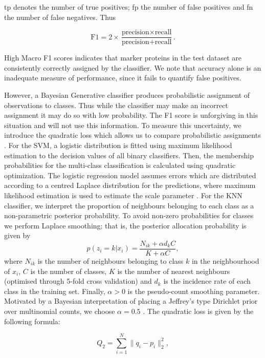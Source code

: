 \documentclass[12pt,english]{article}\usepackage[]{graphicx}\usepackage[]{color}
\begin{document}
tp denotes the number of true positives; fp the number of
false positives and fn the number of false negatives. Thus

\[\text{F1}=2\times\frac{\text{precision}\times\text{recall}}{\text{precision}+\text{recall}}.\]

High Macro F1 scores indicates that marker proteins in the
test dataset are consistently correctly assigned by the
classifier. We note that accuracy alone is an inadequate
measure of performance, since it fails to quantify
false positives.

However, a Bayesian Generative classifier produces
probabilistic assignment of observations to classes. Thus
while the classifier may make an incorrect assignment it may
do so with low probability. The F1 score is unforgiving
in this situation and will not use this information.
To measure this uncertainty, we introduce the quadratic
loss which allows us to compare probabilistic assignments \citep{Gneiting:2007}.
For the SVM, a logistic distribution is fitted
using maximum likelihood estimation to the decision values of
all binary classifiers. Then, the membership probabilities for
the multi-class classification is calculated using quadratic optimization.
The logistic regression model assumes errors which are distributed according
to a centred Laplace distribution for the predictions,
where maximum likelihood estimation is used to estimate the
scale parameter \citep{Meyer:2017}.
For the KNN classifier, we interpret the proportion of neighbours
belonging to each class as a non-parametric posterior probability. To avoid
non-zero probabilities for classes we perform Laplace smoothing; that is, the
posterior allocation probability is given by
\begin{equation}
p(z_i = k|x_i) = \frac{N_{ik} + \alpha d_k C}{K + \alpha C},
\end{equation}
where $N_{ik}$ is the number of neighbours belonging to class $k$ in the
neighbourhood of $x_i$, $C$ is the number of classes, $K$ is the number of nearest
neighbours (optimised through 5-fold cross validation) and $d_k$ is the incidence
rate of each class in the training set. Finally, $\alpha >0$ is the
pseudo-count smoothing parameter. Motivated by a Bayesian interpretation of placing
a Jeffrey's type Dirichlet prior over multinomial counts, we choose $\alpha = 0.5$
\citep{Hazimeh:2015, Valcarce:2016, Manning:2008}.
The quadratic loss is given by the following formula:

\begin{equation}
  Q_2 = \sum_{i = 1}^{N}\lVert q_i - p_i\rVert_2^2,
\end{equation}
\end{document}
